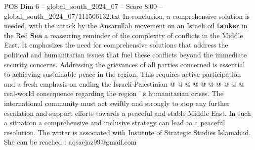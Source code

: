 \begin{textsample}{POS Dim 6 – global\_south\_2024\_07 – Score 8.00 – global\_south\_2024\_07/111506132.txt}
In conclusion, a comprehensive solution is needed, with the attack by the Ansarullah movement on an Israeli oil \textbf{tanker} in the Red \textbf{Sea} a reassuring reminder of the complexity of conflicts in the Middle East.
It emphasizes the need for comprehensive solutions that address the political and humanitarian issues that fuel these conflicts beyond the immediate security concerns.
Addressing the grievances of all parties concerned is essential to achieving sustainable peace in the region.
This requires active participation and a fresh emphasis on ending the Israeli-Palestinian @ @ @ @ @ @ @ @ @ @ real-world consequence regarding the region ' s humanitarian crises.
The international community must act swiftly and strongly to stop any further escalation and support efforts towards a peaceful and stable Middle East.
In such a situation a comprehensive and inclusive strategy can lead to a peaceful resolution.
The writer is associated with Institute of Strategic Studies Islamabad.
She can be reached : aqsaejaz99@gmail.com

\end{textsample}
